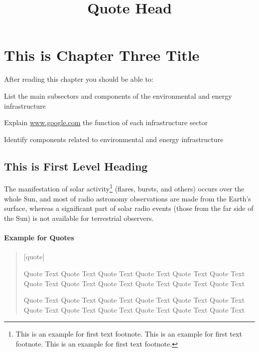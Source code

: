 \bgroup

\chapter{This is Chapter Three Title}

After reading this chapter you should be able to:

\begin{objectives}
\item List the main subsectors and components of the environmental and energy infrastructure

\item Explain \url{www.google.com} the function of each infrastructure sector

\item Identify components related to environmental and energy infrastructure
\end{objectives}

\section{This is First Level Heading}

\lipsum[1]

The manifestation of solar activity\footnote{This is an example for first text footnote. This is an example for first text footnote. This is an example for first text footnote.} (flares, bursts, and others) occurs over the whole Sun, and most of radio astronomy observations are made from the Earth's surface, whereas a significant part of solar radio events (those from the far side of the Sun) is not available for terrestrial observers.

\subsubsection*{Example for Quotes}

\begin{quote}[quote]

\title{Quote Head}

Quote Text  Quote Text  Quote Text  Quote Text Quote Text Quote Text 
Quote Text  Quote Text  Quote Text  Quote Text Quote Text Quote Text 


Quote Text  Quote Text  Quote Text  Quote Text Quote Text Quote Text 
Quote Text  Quote Text  Quote Text  Quote Text Quote Text Quote Text 


\end{quote}

